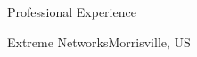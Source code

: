 \documentclass{resume} %
\begin{document}
    \begin{rSection}{Professional Experience}
        \begin{rSubsectionCompany}{Extreme Networks}{Morrisville, US}
            \begin{comment}
                \item Periodic configuration auto-save.
                \item Optimize configuration save/show.
                \item SNMP request queuing and MIB bugs.
                \item CLI usability enhancements.
                \item MLAG orchestration mode.
                \item Improve identification of faulty applications.
                \item Restconf Openconfig Implementation.
                \item Configuration diff.
                \item Standalone system represented as Slotted system.
                \item Secure EXOS from malicious users by hardening North Bound Interfaces.
                \item Fix JSONRPC implementation.
                \item Network Automation - JSONRPC, RESTCONF, Ansible.
                \item Documentation, and Unit Tests, Integration Tests.
                \item CI/CD - Jenkins, Packer, Vagrant, Docker. 
                \item Review Pull Requests and triage Issues.
                \item Wrote Ansible modules for Extreme EXOS switching platform.
                \item Engage with users via IRC, Slack, GitHub.
                \item Evangelize Ansible for network automation to the Team, PLM.
                \item Comfortable communicating with customers and engineers through both formal & informal means - conferences, presentations, or GitHub Pull Requests & Issues.

\end{comment}
\end{rSubsectionCompany}
\end{rSection}
\end{document}
